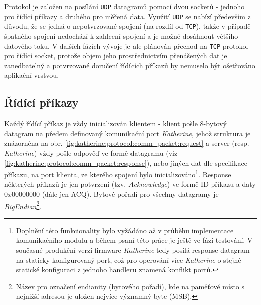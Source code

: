 Protokol je založen na posílání \texttt{UDP} datagramů pomocí dvou socketů - jednoho pro řídící příkazy a druhého pro měřená data. Využití \texttt{UDP} se nabízí především z důvodu, že se jedná o nepotvrzované spojení (na rozdíl od \texttt{TCP}), takže v případě špatného spojení nedochází k zahlcení spojení a je možné dosáhnout většího datového toku. V dalších fázích vývoje je ale plánován přechod na \texttt{TCP} protokol pro řídící socket, protože objem jeho prostřednictvím přenášených dat je zanedbatelný a potvrzované doručení řídících příkazů by nemuselo být ošetřováno aplikační vrstvou.

\subsection{Řídící příkazy}\label{chap:katherine:protocol:control_commands}
Každý řídící příkaz je vždy inicializován klientem - klient pošle 8-bytový datagram na předem definovaný komunikační port \textit{Katherine}, jehož struktura je znázorněna na obr. \ref{fig:katherine:protocol:comm_packet:request} a server (resp. \textit{Katherine}) vždy pošle odpověď ve formě datagramu (viz \ref{fig:katherine:protocol:comm_packet:response}), nebo jiných dat dle specifikace příkazu, na port klienta, ze kterého spojení bylo inicializováno\footnote{Doplnění této funkcionality bylo vyžádáno až v průběhu implementace komunikačního modulu a během psaní této práce je ještě ve fázi testování. V současné produkční verzi firmware \textit{Katherine} tedy posílá response datagram na staticky konfigurovaný port, což pro operování více \textit{Katherine} o stejné statické konfiguraci z jednoho handleru znamená konflikt portů.}. Response některých příkazů je jen potvrzení (tzv. \textit{Acknowledge}) ve formě ID příkazu a daty $0x00000000$ (dále jen ACQ). Bytové pořadí pro všechny datagramy je \textit{BigEndian}\footnote{Název pro označení endianity (bytového pořadí), kde na paměťové místo s nejnižší adresou je uložen nejvíce významný byte (MSB).}.

